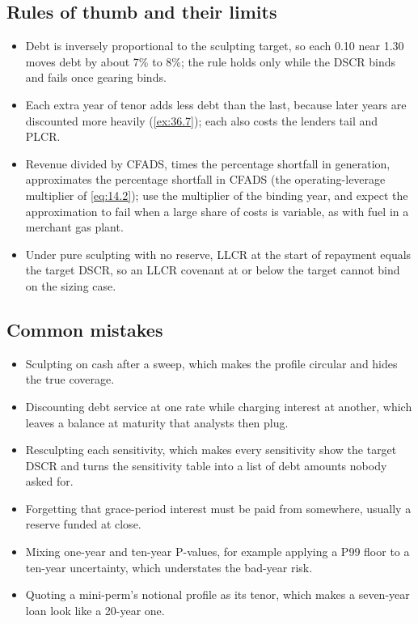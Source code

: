 \subsection*{Rules of thumb and their limits}
\begin{itemize}
\item Debt is inversely proportional to the sculpting target, so each 0.10\x{} near 1.30\x{} moves debt by about 7\% to 8\%; the rule holds only while the DSCR binds and fails once gearing binds.
\item Each extra year of tenor adds less debt than the last, because later years are discounted more heavily (\cref{ex:36.7}); each also costs the lenders tail and PLCR.
\item Revenue divided by CFADS, times the percentage shortfall in generation, approximates the percentage shortfall in CFADS (the operating-leverage multiplier of \cref{eq:14.2}); use the multiplier of the binding year, and expect the approximation to fail when a large share of costs is variable, as with fuel in a merchant gas plant.
\item Under pure sculpting with no reserve, LLCR at the start of repayment equals the target DSCR, so an LLCR covenant at or below the target cannot bind on the sizing case.
\end{itemize}

\subsection*{Common mistakes}
\begin{itemize}
\item Sculpting on cash after a sweep, which makes the profile circular and hides the true coverage.
\item Discounting debt service at one rate while charging interest at another, which leaves a balance at maturity that analysts then plug.
\item Resculpting each sensitivity, which makes every sensitivity show the target DSCR and turns the sensitivity table into a list of debt amounts nobody asked for.
\item Forgetting that grace-period interest must be paid from somewhere, usually a reserve funded at close.
\item Mixing one-year and ten-year P-values, for example applying a P99 floor to a ten-year uncertainty, which understates the bad-year risk.
\item Quoting a mini-perm's notional profile as its tenor, which makes a seven-year loan look like a 20-year one.
\end{itemize}

